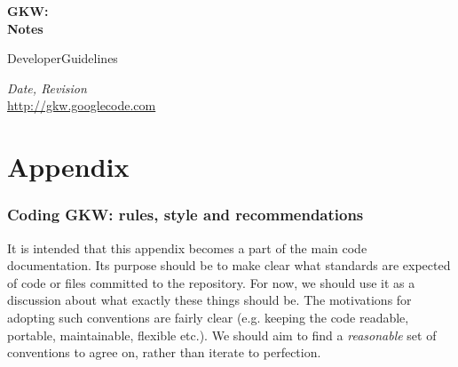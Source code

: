 \documentclass[12pt,twoside,notitlepage,a4paper]{article}
\begin{document}
\pagestyle{empty}
\pagestyle{plain}


\begin{titlepage}
  \begin{center}

  \large

  \vspace*{2cm}

  {\Large\sffamily\bfseries GKW:\\[2\parskip]
    Notes}

  \vspace{3ex}

  {\sffamily DeveloperGuidelines}





  \emph{$ $Date$ $, $ $Revision$ $}\\
  \url{http://gkw.googlecode.com}



\end{center}

\end{titlepage}

\clearpage
\tableofcontents
\cleardoublepage


\cleardoublepage
\appendix
\part{Appendix}




\section{Coding GKW: rules, style and recommendations}

It is intended that this appendix becomes a part of the main code documentation.
Its purpose should be to make clear what standards are expected of code or files
committed to the repository.
For now, we should use it as a discussion about what exactly these things should be.
The motivations for adopting such conventions are fairly clear (e.g. keeping the code
readable, portable, maintainable, flexible etc.). We should aim to
find a {\it reasonable} set of conventions to agree on, rather than iterate to perfection.
\end{document}
